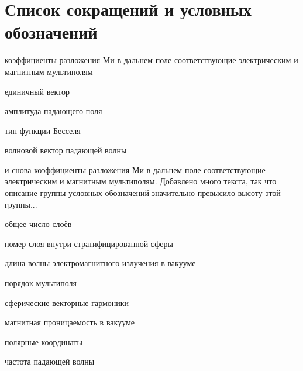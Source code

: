 \chapter*{Список сокращений и условных обозначений} %
\begin{description}[align=right,leftmargin=3.5cm]
\item[%
    \(\begin{rcases}
        a_n\\
        b_n
    \end{rcases}\)%
    ] коэффициенты разложения Ми в дальнем поле соответствующие
электрическим и магнитным мультиполям
\item[%
    \({\boldsymbol{\hat{\mathrm e}}}\)%
    ] единичный вектор
\item[\(E_0\)] амплитуда падающего поля
\item[\(j\)] тип функции Бесселя
\item[\(k\)] волновой вектор падающей волны
\item[%
    \(\begin{rcases}
        a_n\\
        b_n
    \end{rcases}\)%
    ] и снова коэффициенты разложения Ми в дальнем поле соответствующие
электрическим и магнитным мультиполям. Добавлено много текста, так что описание группы условных
обозначений значительно превысило высоту этой группы...
\item[\(L\)] общее число слоёв
\item[\(l\)] номер слоя внутри стратифицированной сферы
\item[\(\lambda\)] длина волны электромагнитного излучения
в вакууме
\item[\(n\)] порядок мультиполя
\item[%
    \(\begin{rcases}
        {\mathbf{N}}_{e1n}^{(j)}&{\mathbf{N}}_{o1n}^{(j)}\\
        {\mathbf{M}_{o1n}^{(j)}}&{\mathbf{M}_{e1n}^{(j)}}
    \end{rcases}\)%
    ] сферические векторные гармоники
\item[\(\mu\)] магнитная проницаемость в вакууме
\item[\(r,\theta,\phi\)] полярные координаты
\item[\(\omega\)] частота падающей волны

\end{description}
